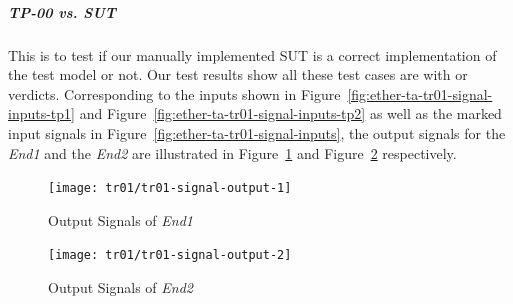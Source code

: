 \subparagraph{\emph{TP-00} vs. \emph{SUT}}
This is to test if our manually implemented SUT is a correct implementation of the test model or not. Our test results show all these test cases are with  or  verdicts. Corresponding to the inputs shown in Figure~\ref{fig:ether-ta-tr01-signal-inputs-tp1} and Figure~\ref{fig:ether-ta-tr01-signal-inputs-tp2} as well as the marked input signals in Figure~\ref{fig:ether-ta-tr01-signal-inputs}, the output signals for the \emph{End1} and the \emph{End2} are illustrated in Figure~\ref{fig:ether-ta-tr01-signal-output-1} and Figure~\ref{fig:ether-ta-tr01-signal-output-2} respectively.

\begin{figure}[htb!]
    \centering
	\texttt{[image: tr01/tr01-signal-output-1]}
    \caption{Output Signals of \emph{End1}}
    \label{fig:ether-ta-tr01-signal-output-1}
\end{figure}

\begin{figure}[htb!]
    \centering
	\texttt{[image: tr01/tr01-signal-output-2]}
    \caption{Output Signals of \emph{End2}}
    \label{fig:ether-ta-tr01-signal-output-2}
\end{figure}

